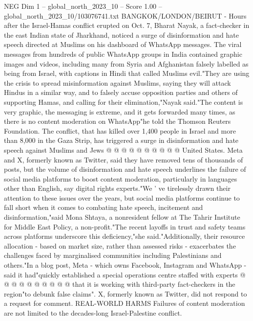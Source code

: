 \begin{textsample}{NEG Dim 1 – global\_north\_2023\_10 – Score 1.00 – global\_north\_2023\_10/103076741.txt}  \label{ex:f1_neg_316}
BANGKOK/LONDON/BEIRUT - Hours after the Israel-Hamas conflict erupted on Oct. 7, Bharat Nayak, a fact-checker in the east Indian state of Jharkhand, noticed a surge of disinformation and hate speech directed at Muslims on his dashboard of WhatsApp messages.
The viral messages from hundreds of public WhatsApp groups in India contained graphic images and videos, including many from Syria and Afghanistan falsely labelled as being from Israel, with captions in Hindi that called Muslims evil."They are using the crisis to spread misinformation against Muslims, saying they will attack Hindus in a similar way, and to falsely accuse opposition parties and others of supporting Hamas, and calling for their elimination,"Nayak said."The content is very graphic, the messaging is extreme, and it gets forwarded many times, as there is no content moderation on WhatsApp"he told the Thomson Reuters Foundation.
The conflict, that has killed over 1,400 people in Israel and more than 8,000 in the Gaza Strip, has triggered a surge in disinformation and hate speech against Muslims and Jews @ @ @ @ @ @ @ @ @ @ United States.
Meta and X, formerly known as Twitter, said they have removed tens of thousands of posts, but the volume of disinformation and hate speech underlines the failure of social media platforms to boost content moderation, particularly in languages other than English, say digital rights experts."We ' ve tirelessly drawn their attention to these issues over the years, but social media platforms continue to fall short when it comes to combating hate speech, incitement and disinformation,"said Mona Shtaya, a nonresident fellow at The Tahrir Institute for Middle East Policy, a non-profit."The recent layoffs in trust and safety teams across platforms underscore this deficiency,"she said."Additionally, their resource allocation - based on market size, rather than assessed risks - exacerbates the challenges faced by marginalised communities including Palestinians and others."In a blog post, Meta - which owns Facebook, Instagram and WhatsApp - said it had"quickly established a special operations centre staffed with experts @ @ @ @ @ @ @ @ @ @ that it is working with third-party fact-checkers in the region"to debunk false claims".
X, formerly known as Twitter, did not respond to a request for comment.
REAL-WORLD HARMS Failures of content moderation are not limited to the decades-long Israel-Palestine conflict.

\end{textsample}
